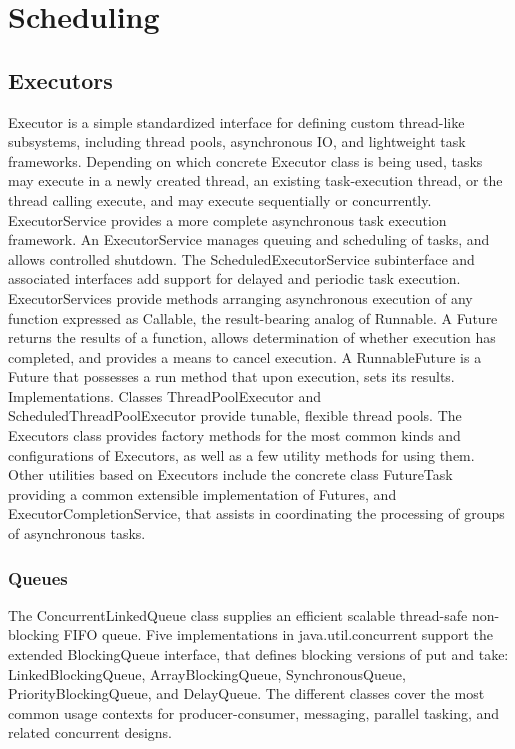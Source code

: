 \chapter{Scheduling}


\section{Executors}
Executor is a simple standardized interface for defining custom thread-like subsystems, including thread pools, asynchronous IO, and lightweight task frameworks. Depending on which concrete Executor class is being used, tasks may execute in a newly created thread, an existing task-execution thread, or the thread calling execute, and may execute sequentially or concurrently. ExecutorService provides a more complete asynchronous task execution framework. An ExecutorService manages queuing and scheduling of tasks, and allows controlled shutdown. The ScheduledExecutorService subinterface and associated interfaces add support for delayed and periodic task execution. ExecutorServices provide methods arranging asynchronous execution of any function expressed as Callable, the result-bearing analog of Runnable. A Future returns the results of a function, allows determination of whether execution has completed, and provides a means to cancel execution. A RunnableFuture is a Future that possesses a run method that upon execution, sets its results.
Implementations. Classes ThreadPoolExecutor and ScheduledThreadPoolExecutor provide tunable, flexible thread pools. The Executors class provides factory methods for the most common kinds and configurations of Executors, as well as a few utility methods for using them. Other utilities based on Executors include the concrete class FutureTask providing a common extensible implementation of Futures, and ExecutorCompletionService, that assists in coordinating the processing of groups of asynchronous tasks.

\subsection{Queues}
The ConcurrentLinkedQueue class supplies an efficient scalable thread-safe non-blocking FIFO queue.
Five implementations in java.util.concurrent support the extended BlockingQueue interface, that defines blocking versions of put and take: LinkedBlockingQueue, ArrayBlockingQueue, SynchronousQueue, PriorityBlockingQueue, and DelayQueue. The different classes cover the most common usage contexts for producer-consumer, messaging, parallel tasking, and related concurrent designs.

